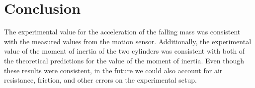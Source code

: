 \documentclass[9pt]{extarticle}
\begin{document}
{\section*{Conclusion}
The experimental value for the acceleration of the falling mass was consistent with the measured values from the motion sensor. Additionally, the experimental value of the moment of inertia of the two cylinders was consistent with both of the theoretical predictions for the value of the moment of inertia. Even though these results were consistent, in the future we could also account for air resistance, friction, and other errors on the experimental setup.
}
\end{document}
